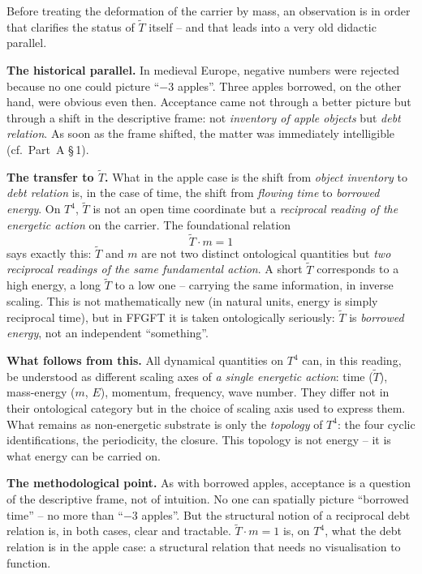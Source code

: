Before treating the deformation of the carrier by mass, an
observation is in order that clarifies the status of $\tilde T$
itself -- and that leads into a very old didactic parallel.

\textbf{The historical parallel.} In medieval Europe, negative
numbers were rejected because no one could picture ``$-3$ apples''.
Three apples borrowed, on the other hand, were obvious even then.
Acceptance came not through a better picture but through a shift in
the descriptive frame: not \emph{inventory of apple objects} but
\emph{debt relation}. As soon as the frame shifted, the matter was
immediately intelligible (cf.\ Part~A §\,1).

\textbf{The transfer to $\tilde T$.} What in the apple case is the
shift from \emph{object inventory} to \emph{debt relation} is, in
the case of time, the shift from \emph{flowing time} to
\emph{borrowed energy}. On $T^4$, $\tilde T$ is not an open time
coordinate but a \emph{reciprocal reading of the energetic action}
on the carrier. The foundational relation
\begin{equation}
  \tilde T \cdot m = 1
\end{equation}
says exactly this: $\tilde T$ and $m$ are not two distinct
ontological quantities but \emph{two reciprocal readings of the same
fundamental action}. A short $\tilde T$ corresponds to a high
energy, a long $\tilde T$ to a low one -- carrying the same
information, in inverse scaling. This is not mathematically new (in
natural units, energy is simply reciprocal time), but in FFGFT it is
taken ontologically seriously: $\tilde T$ is \emph{borrowed energy},
not an independent ``something''.

\textbf{What follows from this.} All dynamical quantities on $T^4$
can, in this reading, be understood as different scaling axes of
\emph{a single energetic action}: time ($\tilde T$), mass-energy
($m$, $E$), momentum, frequency, wave number. They differ not in
their ontological category but in the choice of scaling axis used
to express them. What remains as non-energetic substrate is only
the \emph{topology} of $T^4$: the four cyclic identifications, the
periodicity, the closure. This topology is not energy -- it is what
energy can be carried on.

\textbf{The methodological point.} As with borrowed apples,
acceptance is a question of the descriptive frame, not of intuition.
No one can spatially picture ``borrowed time'' -- no more than
``$-3$ apples''. But the structural notion of a reciprocal debt
relation is, in both cases, clear and tractable.
$\tilde T \cdot m = 1$ is, on $T^4$, what the debt relation is in
the apple case: a structural relation that needs no visualisation
to function.

